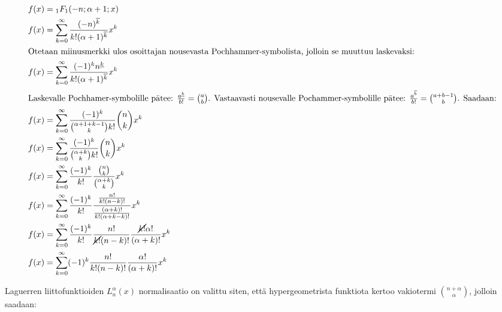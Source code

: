 \documentclass[../johdoksia.tex]{subfiles}
\begin{document}
	\begin{align*}
		f(x) &= {_1{F}_1}(-n; \alpha + 1; x) \\
		f(x) &= \sum_{k = 0}^{\infty}\frac{(-n)^{\overline{k}}}{k!(\alpha + 1)^{\overline{k}}}x^k \\
		\intertext{Otetaan miinusmerkki ulos osoittajan nousevasta Pochhammer-symbolista, jolloin se muuttuu laskevaksi:}
		f(x) &= \sum_{k = 0}^{\infty}\frac{(-1)^kn^{\underline{k}}}{k!(\alpha + 1)^{\overline{k}}}x^k \\
		\intertext{Laskevalle Pochhamer-symbolille pätee: $\frac{a^{\underline{b}}}{b!} = \binom{a}{b}$. Vastaavasti nousevalle Pochammer-symbolille pätee: $\frac{a^{\overline{b}}}{b!} = \binom{a + b - 1}{b}$. Saadaan:}
		f(x) &= \sum_{k = 0}^{\infty}\frac{(-1)^k}{\binom{\alpha + 1 + k - 1}{k}k!}\binom{n}{k}x^k \\
		f(x) &= \sum_{k = 0}^{\infty}\frac{(-1)^k}{\binom{\alpha + k}{k}k!}\binom{n}{k}x^k \\
		f(x) &= \sum_{k = 0}^{\infty}\frac{(-1)^k}{k!}\frac{\binom{n}{k}}{\binom{\alpha + k}{k}}x^k \\
		f(x) &= \sum_{k = 0}^{\infty}\frac{(-1)^k}{k!}\frac{\frac{n!}{k!(n - k)!}}{\frac{(\alpha + k)!}{k!(\alpha + k - k)!}}x^k \\
		f(x) &= \sum_{k = 0}^{\infty}\frac{(-1)^k}{k!}\frac{n!}{\cancel{k!}(n - k)!}\frac{\cancel{k!}\alpha!}{(\alpha + k)!}x^k \\
		f(x) &= \sum_{k = 0}^{\infty}(-1)^k\frac{n!}{k!(n - k)!}\frac{\alpha!}{(\alpha + k)!}x^k
	\end{align*}

	Laguerren liittofunktioiden $L_{n}^{\alpha}(x)$ normalisaatio on valittu siten, että hypergeometrista funktiota kertoo vakiotermi $\binom{n + \alpha}{\alpha}$, jolloin saadaan:
	
\end{document}
